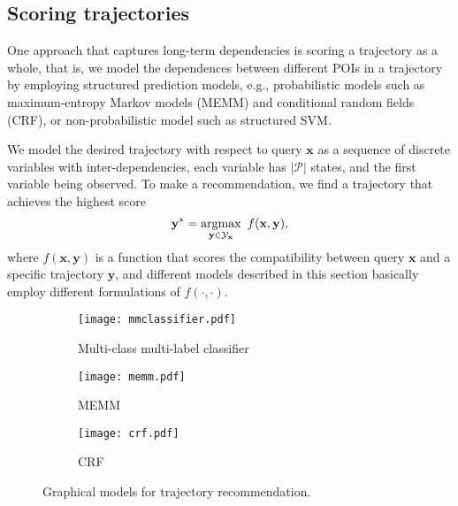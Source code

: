 \subsection{Scoring trajectories}
\label{sec:structured}

One approach that captures long-term dependencies is scoring a trajectory as a whole,
that is, we model the dependences between different POIs in a trajectory by employing structured prediction models,
e.g., probabilistic models such as maximum-entropy Markov models (MEMM) and conditional random fields (CRF),
or non-probabilistic model such as structured SVM.

We model the desired trajectory with respect to query $\mathbf{x}$ as a sequence of discrete variables with inter-dependencies,
each variable has $|\mathcal{P}|$ states, and the first variable being observed.
To make a recommendation, we find a trajectory that achieves the highest score
\begin{equation*}
\mathbf{y}^* = \operatorname*{argmax}_{\mathbf{y} \in \mathcal{Y}_\mathbf{x}}~ f(\mathbf{x}, \mathbf{y}),
\end{equation*}
where $f(\mathbf{x}, \mathbf{y})$ is a function that scores the compatibility between query $\mathbf{x}$ and a specific trajectory $\mathbf{y}$,
and different models described in this section basically employ different formulations of $f(\cdot,\cdot)$. %


\begin{figure}[t]
    \centering
    \begin{subfigure}[t]{.33\textwidth} %
        \centering
        \texttt{[image: mmclassifier.pdf]} %
        \caption{Multi-class multi-label classifier}
    \end{subfigure}
    \begin{subfigure}[t]{.33\textwidth}
        \centering
        \texttt{[image: memm.pdf]}
        \caption{MEMM}
    \end{subfigure}
    \begin{subfigure}[t]{.33\textwidth}
        \centering
        \texttt{[image: crf.pdf]}
        \caption{CRF}
    \end{subfigure}
    \caption{Graphical models for trajectory recommendation.}
    \label{fig:pgm}
\end{figure}


